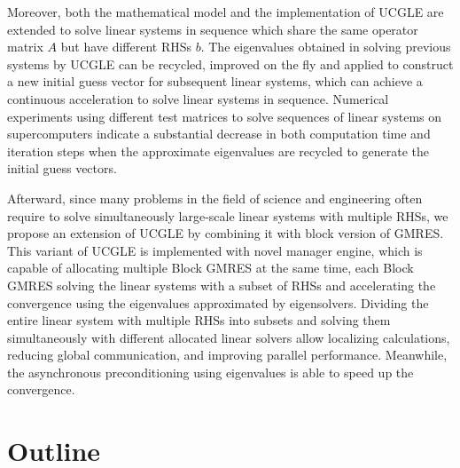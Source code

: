 
Moreover, both the mathematical model and the implementation of UCGLE are extended to solve linear systems in sequence which share the same operator matrix $A$ but have different RHSs $b$. The eigenvalues obtained in solving previous systems by UCGLE can be recycled, improved on the fly and applied to construct a new initial guess vector for subsequent linear systems, which can achieve a continuous acceleration to solve linear systems in sequence. Numerical experiments using different test matrices to solve sequences of linear systems on supercomputers indicate a substantial decrease in both computation time and iteration steps when the approximate eigenvalues are recycled to generate the initial guess vectors.

Afterward, since many problems in the field of science and engineering often require to solve simultaneously large-scale linear systems with multiple RHSs, we propose an extension of UCGLE by combining it with block version of GMRES. This variant of UCGLE is implemented with novel manager engine, which is capable of allocating multiple Block GMRES at the same time, each Block GMRES solving the linear systems with a subset of RHSs and accelerating the convergence using the eigenvalues approximated by eigensolvers. Dividing the entire linear system with multiple RHSs into subsets and solving them simultaneously with different allocated linear solvers allow localizing calculations, reducing global communication, and improving parallel performance. Meanwhile, the asynchronous preconditioning using eigenvalues is able to speed up the convergence. 



\section{Outline}

